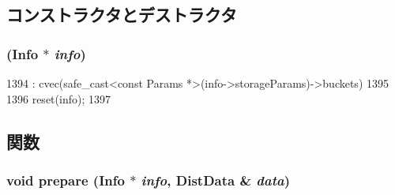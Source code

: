 \subsection{コンストラクタとデストラクタ}
\hypertarget{classStats_1_1DistStor_a38de6f559415738e1cc7bb30ecaaba97}{
\subsubsection[{DistStor}]{ ({\bf Info} $\ast$ {\em info})}}
\label{classStats_1_1DistStor_a38de6f559415738e1cc7bb30ecaaba97}



\begin{DoxyCode}
1394         : cvec(safe_cast<const Params *>(info->storageParams)->buckets)
1395     {
1396         reset(info);
1397     }
\end{DoxyCode}


\subsection{関数}
\hypertarget{classStats_1_1DistStor_a2e5e3cd36b4a3d6ab774aed4e3fcd641}{
\subsubsection[{prepare}]{\setlength{\rightskip}{0pt plus 5cm}void prepare ({\bf Info} $\ast$ {\em info}, \/  {\bf DistData} \& {\em data})}}
\label{classStats_1_1DistStor_a2e5e3cd36b4a3d6ab774aed4e3fcd641}



